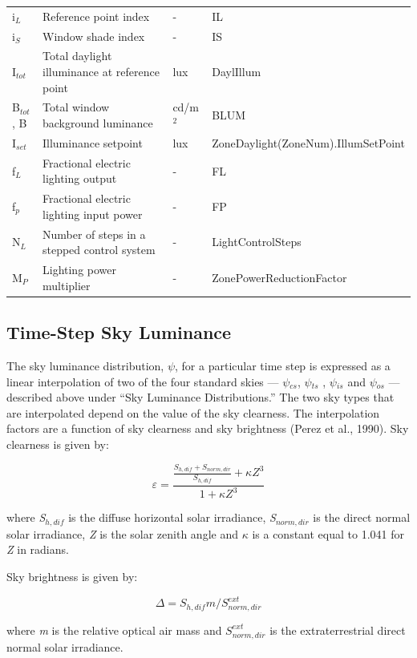 \begin{longtable}[c]{p{1.0in}p{2.0in}p{1.0in}p{2.0in}}
i\(_{L}\) & Reference point index & - & IL \tabularnewline
i\(_{S}\) & Window shade index & - & IS \tabularnewline
I\(_{tot}\) & Total daylight illuminance at reference point & lux & DaylIllum \tabularnewline
B\(_{tot}\), B & Total window background luminance & cd/m\(^{2}\) & BLUM \tabularnewline
I\(_{set}\) & Illuminance setpoint & lux & ZoneDaylight(ZoneNum).IllumSetPoint \tabularnewline
f\(_{L}\) & Fractional electric lighting output & - & FL \tabularnewline
f\(_{p}\) & Fractional electric lighting input power & - & FP \tabularnewline
N\(_{L}\) & Number of steps in a stepped control system & - & LightControlSteps \tabularnewline
M\(_{P}\) & Lighting power multiplier & - & ZonePowerReductionFactor \tabularnewline
\bottomrule
\end{longtable}

\subsection{Time-Step Sky Luminance}\label{time-step-sky-luminance}

The sky luminance distribution, \emph{$\psi$}, for a particular time step is expressed as a linear interpolation of two of the four standard skies --- \emph{$\psi$\(_{cs}\)}, \emph{$\psi$\(_{ts}\)} , \emph{$\psi$\(_{is}\)} and \emph{$\psi$\(_{os}\)} --- described above under ``Sky Luminance Distributions.'' The two sky types that are interpolated depend on the value of the sky clearness. The interpolation factors are a function of sky clearness and sky brightness (Perez et al., 1990). Sky clearness is given by:

\begin{equation}
\varepsilon  = \frac{{\frac{{{S_{h,dif}} + {S_{norm,dir}}}}{{{S_{h,dif}}}} + \kappa {Z^3}}}{{1 + \kappa {Z^3}}}
\end{equation}

where \emph{S\(_{h,dif}\)} is the diffuse horizontal solar irradiance, \emph{S\(_{norm,dir}\)} is the direct normal solar irradiance, \emph{Z} is the solar zenith angle and \emph{$\kappa$} is a constant equal to 1.041 for \emph{Z} in radians.

Sky brightness is given by:

\begin{equation}
\Delta  = {S_{h,dif}}m/S_{norm,dir}^{ext}
\end{equation}

where \emph{m} is the relative optical air mass and \(S_{norm,dir}^{ext}\) is the extraterrestrial direct normal solar irradiance.


